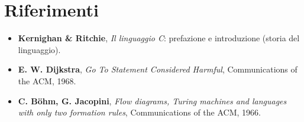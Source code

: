 \section{Riferimenti}

\begin{itemize}
  \item \textbf{Kernighan \& Ritchie}, \textit{Il linguaggio C}: prefazione e
        introduzione (storia del linguaggio).
  \item \textbf{E. W. Dijkstra}, \textit{Go To Statement Considered Harmful},
        Communications of the ACM, 1968.
  \item \textbf{C. Böhm, G. Jacopini}, \textit{Flow diagrams, Turing machines
        and languages with only two formation rules}, Communications of the
        ACM, 1966.
\end{itemize}
